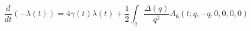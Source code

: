 \begin{equation}
\frac{d}{dt} ( - \lambda (t)) = 4 \gamma (t) \lambda (t) + \frac{1}{2}
\int_q \frac{\Delta (q)}{q^2} A_6 (t; q,-q,0,0,0,0)
\end{equation}


